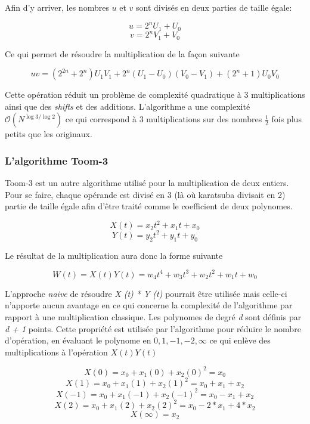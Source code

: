 \documentclass[letterpaper]{article}
\begin{document}
Afin d'y arriver, les nombres $u$ et $v$ sont divisés en deux parties de taille
égale:

  $$u = 2^{n} U_1 + U_0$$
  $$v = 2^{n} V_1 + V_0$$

Ce qui permet de résoudre la multiplication de la façon suivante

  $$uv = (2^{2n} + 2^n) U_1 V_1 + 2^n (U_1 - U_0) (V_0 - V_1) + (2^n + 1) U_0 V_0$$

Cette opération réduit un problème de complexité quadratique à 3 multiplications
ainsi que des \emph{shifts} et des additions.
L'algorithme a une complexité $\mathcal{O}(N^{\log{3}/\log{2}})$ ce  qui
correspond à $3$ multiplications sur des nombres $\frac{1}{2}$ fois plus petits
que les originaux\cite{gmplibkaratsuba}.

\subsubsection{L'algorithme Toom-3}

Toom-3 est un autre algorithme utilisé pour la multiplication de deux
entiers. Pour se faire, chaque opérande est divisé en 3 (là où karatsuba
divisait en 2) partie de taille égale afin d'être traité comme le
coefficient de deux polynomes\cite{gmplib2014}.

    $$X(t) = x_2 t^2 + x_1 t + x_0$$
    $$Y(t) = y_2 t^2 + y_1 t + y_0$$

Le résultat de la multiplication aura donc la forme suivante

    $$W(t) = X(t) Y(t) =  w_4 t^4 + w_3 t^3 + w_2 t^2 + w_1 t + w_0$$

L'approche \emph{naive} de résoudre \emph{X (t) * Y (t)} pourrait être utilisée
mais celle-ci n'apporte aucun avantage en ce qui concerne la complexité de
l'algorithme par rapport à une multiplication classique.\cite{gmplib2014}
\newline
Les polynomes de degré \emph{d} sont définis par \emph{d + 1} points. Cette
propriété est utilisée par l'algorithme pour réduire le nombre d'opération, en
évaluant le polynome en $0, 1, -1, -2, \infty$ ce qui enlève des multiplications
à l'opération $X(t) Y(t)$\cite{wikitoom3}

    $$X (0) = x_{0} + x_{1} (0) + x_2 {(0)}^{2} = x_{0}$$
    $$X(1) = x_0 + x_1(1) + x_2{(1)}^2 = x_0 + x_1 + x_2$$
    $$X(-1) = x_0 + x_1(-1) + x_2{(-1)}^2 = x_0 - x_1 + x_2$$
    $$X(2) = x_0 + x_1(2) + x_2{(2)}^2 = x_0 - 2 * x_1 + 4 * x_2$$
    $$X(\infty) = x_2$$
\end{document}
